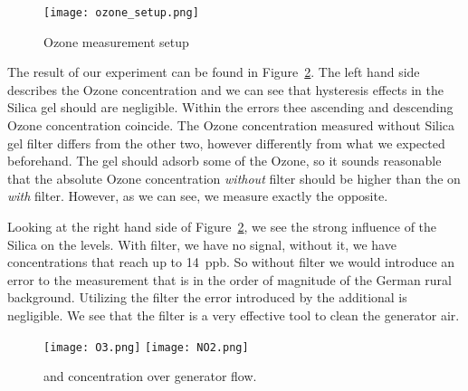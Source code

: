 \begin{figure}[htbp]
  \centering
  \texttt{[image: ozone\_setup.png]}
  \caption{Ozone measurement setup}
  \label{fig:ozone-flow-setup}
\end{figure}

The result of our experiment can be found in
Figure~\ref{fig:o3-flow}. The left hand side describes the Ozone
concentration and we can see that hysteresis effects in the Silica gel
should are negligible. Within the errors thee ascending and descending
Ozone concentration coincide. The Ozone concentration measured without
Silica gel filter differs from the other two, however differently from
what we expected beforehand. The gel should adsorb some of the Ozone,
so it sounds reasonable that the absolute Ozone concentration
\emph{without} filter should be higher than the on \emph{with}
filter. However, as we can see, we measure exactly the opposite. 

Looking at the right hand side of Figure~\ref{fig:o3-flow}, we see the
strong influence of the Silica on the  levels. With filter, we
have no  signal, without it, we have concentrations that reach
up to \SI{14}{ppb}. So without filter we would introduce an error to
the  measurement that is in the order of magnitude of the
German rural background. Utilizing the filter the error
introduced by the additional  is negligible. We see that the
filter is a very effective tool to clean the generator air.

\begin{figure}[htbp]
  \centering
  \texttt{[image: O3.png]}
  \hfill
  \texttt{[image: NO2.png]}
  \caption{ and  concentration over generator flow.}
  \label{fig:o3-flow}
\end{figure}

